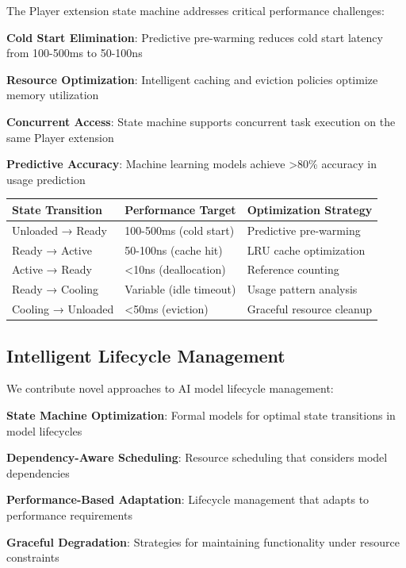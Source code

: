 The Player extension state machine addresses critical performance challenges:

\begin{expandedlist}
    \item \textbf{Cold Start Elimination}: Predictive pre-warming reduces cold start latency from 100-500ms to 50-100ns
    \item \textbf{Resource Optimization}: Intelligent caching and eviction policies optimize memory utilization
    \item \textbf{Concurrent Access}: State machine supports concurrent task execution on the same Player extension
    \item \textbf{Predictive Accuracy}: Machine learning models achieve >80\% accuracy in usage prediction
\end{expandedlist}

\begin{center}
\begin{tabular}{@{}lll@{}}
\toprule
\textbf{State Transition} & \textbf{Performance Target} & \textbf{Optimization Strategy} \\
\midrule
Unloaded → Ready & 100-500ms (cold start) & Predictive pre-warming \\
Ready → Active & 50-100ns (cache hit) & LRU cache optimization \\
Active → Ready & <10ns (deallocation) & Reference counting \\
Ready → Cooling & Variable (idle timeout) & Usage pattern analysis \\
Cooling → Unloaded & <50ms (eviction) & Graceful resource cleanup \\
\bottomrule
\end{tabular}
\end{center}

\subsection*{Intelligent Lifecycle Management}

We contribute novel approaches to AI model lifecycle management:

\begin{expandedlist}
    \item \textbf{State Machine Optimization}: Formal models for optimal state transitions in model lifecycles
    \item \textbf{Dependency-Aware Scheduling}: Resource scheduling that considers model dependencies
    \item \textbf{Performance-Based Adaptation}: Lifecycle management that adapts to performance requirements
    \item \textbf{Graceful Degradation}: Strategies for maintaining functionality under resource constraints
\end{expandedlist}

